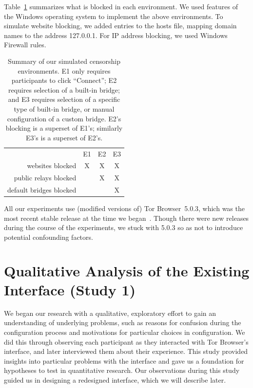 \documentclass[USenglish,oneside,twocolumn]{article}
\begin{document}
\smallskip

Table~\ref{tab:environments} summarizes what is blocked
in each environment.
We used features of the Windows operating system to implement
the above environments.
To simulate website blocking, we added entries to the hosts file,
mapping domain names to the address 127.0.0.1.
For IP address blocking, we used Windows Firewall rules.

\begin{table}
\centering
\begin{tabular}{r c c c}
& E1 & E2 & E3 \\
websites blocked & X & X & X \\
public relays blocked & & X & X \\
default bridges blocked & & & X \\
\end{tabular}
\caption{
Summary of our simulated censorship environments.
E1 only requires participants to click ``Connect'';
E2 requires selection of a built-in bridge;
and E3 requires selection of a specific type of built-in bridge,
or manual configuration of a custom bridge.
E2's blocking is a superset of E1's;
similarly E3's is a superset of E2's.
}
\label{tab:environments}
\end{table}

All our experiments use (modified versions of)
Tor Browser~5.0.3, which was the most recent stable release at the time we began~\cite{torbrowser-503}.
Though there were new releases during the course of the experiments,
we stuck with 5.0.3 so as not to introduce potential confounding factors.

\section{Qualitative Analysis of the Existing Interface (Study 1)}
\label{sec:qualitative}

We began our research with a qualitative, exploratory effort to gain an 
understanding of underlying problems, such as reasons for confusion 
during the configuration process and motivations for particular choices in 
configuration. We did this through observing each participant as they 
interacted with Tor Browser's interface, and later interviewed them about
their experience. This study provided insights into particular problems with 
the interface
and gave us a foundation
for hypotheses to test in quantitative research. 
Our observations during this study guided us in designing
a redesigned interface, which we will describe later.
\end{document}
